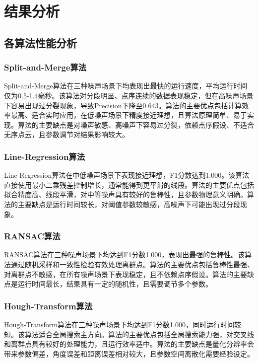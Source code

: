 \documentclass[12pt,a4paper]{article}
\begin{document}
\section{结果分析}

\subsection{各算法性能分析}

\subsubsection{Split-and-Merge算法}

Split-and-Merge算法在三种噪声场景下均表现出最快的运行速度，平均运行时间仅为0.5-1.4毫秒。该算法对分段明显、点序连续的数据表现稳定，但在高噪声场景下容易出现过分裂现象，导致Precision下降至0.643。算法的主要优点包括计算效率最高、适合实时应用，在低噪声场景下精度接近理想，且算法原理简单、易于实现。算法的主要缺点是对噪声敏感、高噪声下容易过分裂，依赖点序假设、不适合无序点云，且参数调节对结果影响较大。

\subsubsection{Line-Regression算法}

Line-Regression算法在中低噪声场景下表现接近理想，F1分数达到1.000。该算法直接使用最小二乘残差控制增长，通常能得到更平滑的线段。算法的主要优点包括拟合精度高、线段平滑，对中等噪声具有较好的鲁棒性，且参数物理意义明确。算法的主要缺点是运行时间较长，对阈值参数较敏感，高噪声下可能出现过分段现象。

\subsubsection{RANSAC算法}

RANSAC算法在三种噪声场景下均达到F1分数1.000，表现出最强的鲁棒性。该算法通过随机采样和一致性检验有效处理离群点。算法的主要优点包括鲁棒性最强、对离群点不敏感，在所有噪声场景下表现稳定，且不依赖点序假设。算法的主要缺点是运行时间最长，结果具有一定的随机性，且需要调节多个参数。

\subsubsection{Hough-Transform算法}

Hough-Transform算法在三种噪声场景下均达到F1分数1.000，同时运行时间较短。该算法适合全局搜索主方向。算法的主要优点包括全局搜索能力强，对交叉线和离群点具有较好的处理能力，且运行效率适中。算法的主要缺点是量化分辨率会带来参数偏差，角度误差和距离误差相对较大，且参数空间离散化需要经验设定。
\end{document}
